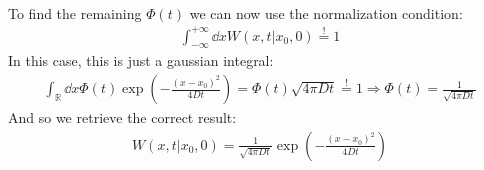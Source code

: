 \documentclass[../template.tex]{subfiles}
\begin{document}
\begin{example}
\begin{align*}
    \end{align*}
    To find the remaining $\Phi(t)$ we can now use the normalization condition:
    \begin{align*}
        \int_{-\infty}^{+\infty} \dd{x} W(x,t|x_0,0) \overset{!}{=}  1
    \end{align*}
    In this case, this is just a gaussian integral:
    \begin{align*}
        \int_{\mathbb{R}} \dd{x} \Phi(t) \exp\left(-\frac{(x-x_0)^2}{4 D t} \right) = \Phi(t) \sqrt{4 \pi D t} \overset{!}{=} 1 \Rightarrow \Phi(t) = \frac{1}{\sqrt{4 \pi D t}} 
    \end{align*}
    And so we retrieve the correct result:
    \begin{align*}
        W(x,t|x_0,0) = \frac{1}{\sqrt{4 \pi D t}} \exp\left(-\frac{(x-x_0)^2}{4Dt} \right)
    \end{align*}
\end{example}
\end{document}
